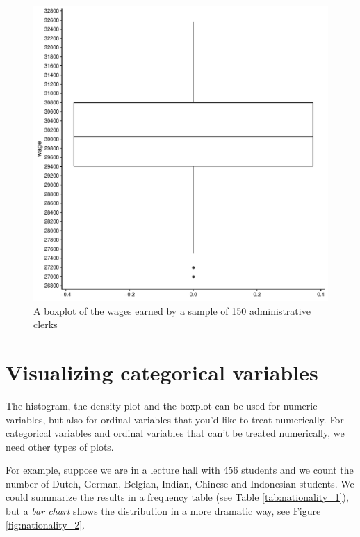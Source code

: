 \documentclass[]{book}\usepackage[]{graphicx}\usepackage[]{color}
\makeatletter
\def\maxwidth{ %
  \ifdim\Gin@nat@width>\linewidth
    \linewidth
  \else
    \Gin@nat@width
  \fi
}
\newenvironment{knitrout}{}{} %
\makeatother
\begin{document}
\begin{knitrout}
\color{fgcolor}\begin{figure}

{\centering \includegraphics[width=\maxwidth]{figure/chis_7-1} 

}

\caption[A boxplot of the wages earned by a sample of 150 administrative clerks]{A boxplot of the wages earned by a sample of 150 administrative clerks}\label{fig:chis_7}
\end{figure}


\end{knitrout}




\section{Visualizing categorical variables}

The histogram, the density plot and the boxplot can be used for numeric variables, but also for ordinal variables that you'd like to treat numerically. For categorical variables and ordinal variables that can't be treated numerically, we need other types of plots.

For example, suppose we are in a lecture hall with 456 students and we count the number of Dutch, German, Belgian, Indian, Chinese and Indonesian students. We could summarize the results in a frequency table (see Table \ref{tab:nationality_1}), but a \textit{bar chart} shows the distribution in a more dramatic way, see Figure \ref{fig:nationality_2}.
\end{document}
